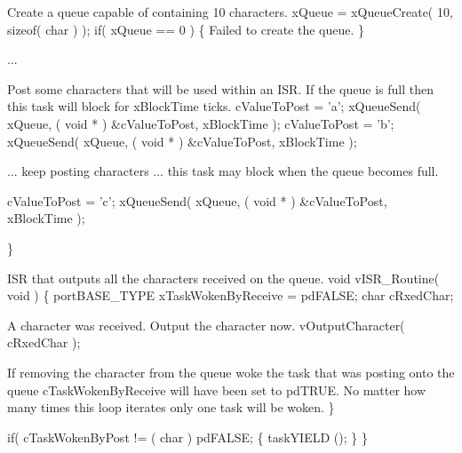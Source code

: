 \begin{DoxyPre}Create a queue capable of containing 10 characters.
        xQueue = xQueueCreate( 10, sizeof( char ) );
        if( xQueue == 0 )
        \{
Failed to create the queue.
        \}\end{DoxyPre}



\begin{DoxyPre}...\end{DoxyPre}



\begin{DoxyPre}Post some characters that will be used within an ISR.  If the queue
is full then this task will block for xBlockTime ticks.
        cValueToPost = 'a';
        xQueueSend( xQueue, ( void * ) \&cValueToPost, xBlockTime );
        cValueToPost = 'b';
        xQueueSend( xQueue, ( void * ) \&cValueToPost, xBlockTime );\end{DoxyPre}



\begin{DoxyPre}... keep posting characters ... this task may block when the queue
becomes full.
\begin{DoxyVerb}    cValueToPost = 'c';
    xQueueSend( xQueue, ( void * ) &cValueToPost, xBlockTime );
\end{DoxyVerb}

 \}\end{DoxyPre}



\begin{DoxyPre}ISR that outputs all the characters received on the queue.
 void vISR\_Routine( void )
 \{
 portBASE\_TYPE xTaskWokenByReceive = pdFALSE;
 char cRxedChar;
\begin{DoxyVerb}   while( xQueueReceiveFromISR( xQueue, ( void * ) &cRxedChar, &xTaskWokenByReceive) )
   {
\end{DoxyVerb}

A character was received.  Output the character now.
                vOutputCharacter( cRxedChar );\end{DoxyPre}



\begin{DoxyPre}If removing the character from the queue woke the task that was
posting onto the queue cTaskWokenByReceive will have been set to
pdTRUE.  No matter how many times this loop iterates only one
task will be woken.
        \}\end{DoxyPre}



\begin{DoxyPre}        if( cTaskWokenByPost != ( char ) pdFALSE;
        \{
                taskYIELD ();
        \}
 \}
 \end{DoxyPre}
 